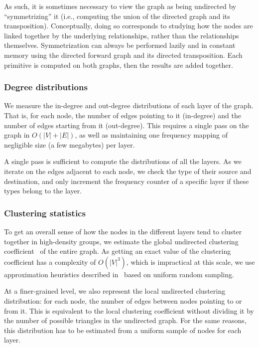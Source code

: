 As such, it is sometimes necessary to view the graph as being undirected by
``symmetrizing'' it (i.e., computing the union of the directed graph and its
transposition). Conceptually, doing so corresponds to studying how the nodes
are linked together by the underlying relationships, rather than the
relationships themselves.
Symmetrization can always be performed lazily and in constant memory using the
directed forward graph and its directed transposition. Each primitive is
computed on both graphs, then the results are added together.

\subsubsection{Degree distributions}
We measure the in-degree and out-degree distributions of each layer of the graph.
That is, for each node, the number of edges pointing to it (in-degree) and the
number of edges starting from it (out-degree).
This requires a single pass on the graph in $O(|V|+|E|)$, as well as
maintaining one frequency mapping of negligible size (a few megabytes) per
layer.

A single pass is sufficient to compute the distributions of all the layers. As
we iterate on the edges adjacent to each node, we check the type of their
source and destination, and only increment the frequency counter of a specific
layer if these types belong to the layer.

\subsubsection{Clustering statistics}
To get an overall sense of how the nodes in the different layers tend to
cluster together in high-density groups, we estimate the global undirected
clustering coefficient~\cite{watts1998collective} of the entire graph. As
getting an exact value of the clustering coefficient has a complexity of
$O(|V|^3)$, which is impractical at this scale, we use approximation
heuristics described in~\cite{schank2005approximating} based on uniform random
sampling.

At a finer-grained level, we also represent the local undirected clustering
distribution: for each node, the number of edges between nodes pointing to or
from it. This is equivalent to the local clustering coefficient without
dividing it by the number of possible triangles in the undirected graph.
For the same reasons, this distribution has to be estimated from a uniform
sample of nodes for each layer.

